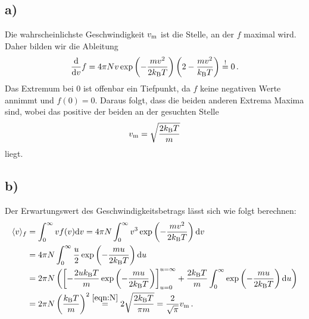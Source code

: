 \documentclass[a4paper, 11pt]{article}
\DeclarePairedDelimiter{\ev}{\langle}{\rangle}
\begin{document}
\subsection*{a)}
Die wahrscheinlichste Geschwindigkeit $v_\textup{m}$ ist die Stelle, an der $f$ maximal wird. Daher bilden wir die Ableitung
\begin{equation}
    \frac{\textup{d}}{\textup{d}v}f = 4\pi Nv\exp\left(-\frac{m v^2}{2 k_\textup{B}T}\right)\left(2 - \frac{mv^2}{k_\textup{B}T}\right) \stackrel{\textup{!}}{=} 0 \,.
\end{equation}
Das Extremum bei 0 ist offenbar ein Tiefpunkt, da $f$ keine negativen Werte annimmt und $f(0) = 0$. Daraus folgt, dass die beiden anderen Extrema Maxima sind, wobei das positive der beiden an der gesuchten Stelle
\begin{equation}
    v_\textup{m} = \sqrt{\frac{2 k_\textup{B} T}{m}}
    \label{eqn:v_m}
\end{equation}
liegt.

\subsection*{b)}
Der Erwartungswert des Geschwindigkeitsbetrags lässt sich wie folgt berechnen:
\begin{align}
    \ev{v}_f &= \int_{0}^{\infty} v f(v) \textup{d}v = 4\pi N \int_{0}^{\infty} v^3 \exp\left(-\frac{mv^2}{2k_\textup{B}T}\right) \textup{d}v \\
    &= 4\pi N \int_{0}^{\infty} \frac{u}{2} \exp\left(-\frac{mu}{2k_\textup{B}T}\right) \textup{d}u \\
    &= 2\pi N\left(\left[-\frac{2uk_\textup{B}T}{m}\exp\left(-\frac{mu}{2k_\textup{B}T}\right)\right]_{u=0}^{u=\infty} + \frac{2k_\textup{B}T}{m}\int_{0}^{\infty}\exp\left(-\frac{mu}{2k_\textup{B}T}\right) \textup{d}u\right) \\
    &= 2\pi N\left(\frac{k_\textup{B}T}{m}\right)^2 \stackrel{\eqref{eqn:N}}{=} 2 \sqrt{\frac{2k_\textup{B}T}{\pi m}} = \frac{2}{\sqrt{\pi}}v_\textup{m} \,.
\end{align}
\end{document}
